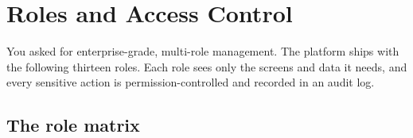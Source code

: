 \documentclass[11pt,a4paper]{article}
\begin{document}
\clearpage

\section{Roles and Access Control}

You asked for enterprise-grade, multi-role management. The platform ships with the
following thirteen roles. Each role sees only the screens and data it needs, and every
sensitive action is permission-controlled and recorded in an audit log.

\subsection{The role matrix}
\end{document}
